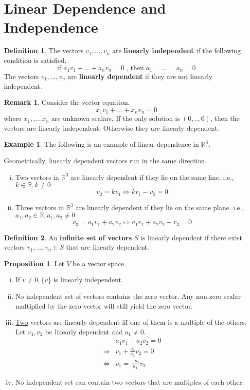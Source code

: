 \documentclass{report}
\theoremstyle{definition}
\newtheorem{_def}{Definition}
\newtheorem{_rem}{Remark}
\newtheorem{ex}{Example}
\newtheorem{_prop}{Proposition}
\begin{document}
\section{Linear Dependence and Independence}

\begin{_def}
The vectors $v_1,...,v_n$ are \textbf{linearly independent} if the following condition is satisfied,
\[\text{if }a_1v_1+...+a_nv_n=0\text{ , then }a_1=...=a_n=0\]
The vectors $v_1,...,v_n$ are \textbf{linearly dependent} if they are not linearly independent.
\end{_def}

\begin{_rem}
Consider the vector equation,
\[x_1v_1+...+x_nv_n=0\]
where $x_1,...,x_n$ are unknown scalars.
If the only solution is $(0,..,0)$, then the vectors are linearly independent.
Otherwise they are linearly dependent.
\end{_rem}

\begin{ex}
The following is an example of linear dependence in $\mathbb{R}^3$.

Geometrically, linearly dependent vectors run in the same direction.
\begin{enumerate}[i)]
 \item Two vectors in $\mathbb{R}^3$ are linearly dependent if they lie on the same line.
 i.e., $k\in \mathbb{R}, k\neq 0$
 \[v_2=kv_1 \Leftrightarrow kv_1-v_2=0\]
 \item Three vectors in $\mathbb{R}^3$ are linearly dependent if they lie on the same plane.
 i.e., $a_1,a_2\in \mathbb{R}, a_1,a_2\neq 0$
 \[v_3=a_1v_1+a_2v_2 \Leftrightarrow a_1v_1+a_2v_2-v_3=0\]
\end{enumerate}
\end{ex}

\begin{_def}
An \textbf{infinite set of vectors} $S$ is linearly dependent if there exist vectors $v_1,...,v_n\in S$ that are linearly dependent.
\end{_def}

\begin{_prop}
Let $V$ be a vector space.
\begin{enumerate}[i)]
 \item If $v\neq 0, \{v\}$ is linearly independent.
 \item No independent set of vectors contains the zero vector.
 Any non-zero scalar multiplied by the zero vector will still yield the zero vector.
 \item \underline{Two} vectors are linearly dependent iff one of them is a multiple of the others.
 Let $v_1, v_2$ be linearly dependent and $a_1\neq 0$.
 \begin{align*}
 &a_1v_1+a_2v_2=0 \\
 \Rightarrow & v_1+\frac{a_2}{a_1}v_2=0 \\
 \Leftrightarrow & v_1=\frac{-a_2}{a_1}v_2
 \end{align*}
 \item No independent set can contain two vectors that are multiples of each other.
\end{enumerate}
\end{_prop}
\end{document}
